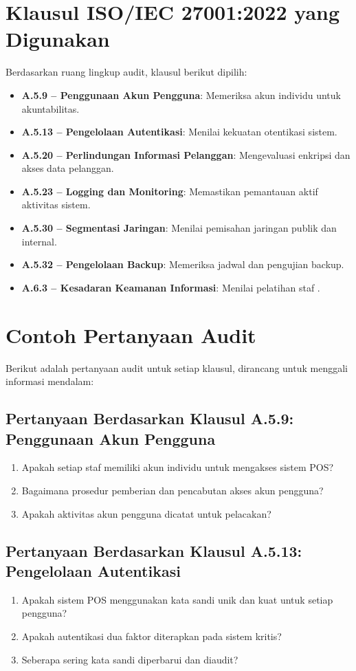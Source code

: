 \documentclass[12pt, a4paper]{report}
\begin{document}
\section{Klausul ISO/IEC 27001:2022 yang Digunakan}
Berdasarkan ruang lingkup audit, klausul berikut dipilih:
\begin{itemize}
    \item \textbf{A.5.9 – Penggunaan Akun Pengguna}: Memeriksa akun individu untuk akuntabilitas.
    \item \textbf{A.5.13 – Pengelolaan Autentikasi}: Menilai kekuatan otentikasi sistem.
    \item \textbf{A.5.20 – Perlindungan Informasi Pelanggan}: Mengevaluasi enkripsi dan akses data pelanggan.
    \item \textbf{A.5.23 – Logging dan Monitoring}: Memastikan pemantauan aktif aktivitas sistem.
    \item \textbf{A.5.30 – Segmentasi Jaringan}: Menilai pemisahan jaringan publik dan internal.
    \item \textbf{A.5.32 – Pengelolaan Backup}: Memeriksa jadwal dan pengujian backup.
    \item \textbf{A.6.3 – Kesadaran Keamanan Informasi}: Menilai pelatihan staf \citep{iso27001, widodo2022keamanan}.
\end{itemize}

\section{Contoh Pertanyaan Audit}
Berikut adalah pertanyaan audit untuk setiap klausul, dirancang untuk menggali informasi mendalam:

\subsection{Pertanyaan Berdasarkan Klausul A.5.9: Penggunaan Akun Pengguna}
\begin{enumerate}
    \item Apakah setiap staf memiliki akun individu untuk mengakses sistem POS?
    \item Bagaimana prosedur pemberian dan pencabutan akses akun pengguna?
    \item Apakah aktivitas akun pengguna dicatat untuk pelacakan? \citep{widodo2022keamanan}
\end{enumerate}

\subsection{Pertanyaan Berdasarkan Klausul A.5.13: Pengelolaan Autentikasi}
\begin{enumerate}
    \item Apakah sistem POS menggunakan kata sandi unik dan kuat untuk setiap pengguna?
    \item Apakah autentikasi dua faktor diterapkan pada sistem kritis?
    \item Seberapa sering kata sandi diperbarui dan diaudit? \citep{rijal2022iso}
\end{enumerate}
\end{document}
